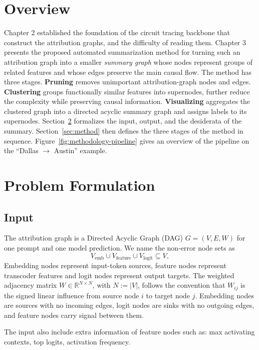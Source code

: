 \documentclass[../main.tex]{subfiles}
\begin{document}
\section{Overview}

Chapter 2 established the foundation of the circuit tracing backbone that construct the attribution graphs, and the difficulty of reading them. Chapter 3 presents the proposed automated summarization method for
turning such an attribution graph into a smaller \emph{summary graph} whose nodes
represent groups of related features and whose edges preserve the main causal
flow. The method has three stages. \textbf{Pruning} removes unimportant attribution-graph
nodes and edges. \textbf{Clustering}
groups functionally similar features into supernodes, further reduce the complexity while preserving causal information. \textbf{Visualizing} aggregates
the clustered graph into a directed acyclic summary graph and assigns
labels to its supernodes. Section~\ref{sec:problem} formalizes the input, output,
and the desiderata of the summary. Section~\ref{sec:method}
then defines the three stages of the method in sequence.
Figure~\ref{fig:methodology-pipeline} gives an overview of the pipeline on the
``Dallas $\to$ Austin'' example.



\section{Problem Formulation}
\label{sec:problem}

\subsection{Input}

The attribution graph is a Directed Acyclic Graph (DAG) $G = (V, E, W)$ for one prompt and one model
prediction. We name the non-error node sets as
\[
V_{\text{emb}} \cup V_{\text{feature}} \cup V_{\text{logit}} \subseteq V,
\]
Embedding nodes represent input-token
sources, feature nodes represent transcoder features and logit nodes represent output targets. The weighted adjacency matrix
$W \in \mathbb{R}^{N \times N}$, with $N := |V|$, follows the convention
that $W_{ij}$ is the signed linear influence from source node $i$ to target
node $j$. Embedding
nodes are sources with no incoming edges, logit nodes are sinks with no outgoing
edges, and feature nodes carry signal between them.

The input also include extra information of feature nodes such as: max activating contexts, top logits, activation frequency.
\end{document}
